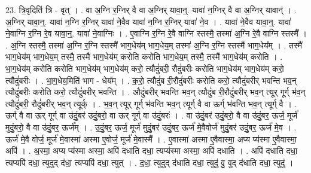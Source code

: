 \documentclass[17pt]{extarticle}
\begin{document}
23. त्रि॒वृदिति॑ त्रि - वृत् । . वा अ॒ग्नि र॒ग्निर् वै वा अ॒ग्निर् यावा॒न्॒. यावा॑ न॒ग्निर् वै वा अ॒ग्निर् यावान्॑ । . अ॒ग्निर् यावा॒न्॒. यावा॑ न॒ग्नि र॒ग्निर् यावा॑ ने॒वैव यावा॑ न॒ग्नि र॒ग्निर् यावा॑ ने॒व । . यावा॑ ने॒वैव यावा॒न्॒. यावा॑ ने॒वाग्नि र॒ग्नि रे॒व यावा॒न्॒. यावा॑ ने॒वाग्निः । . ए॒वाग्नि र॒ग्नि रे॒वै वाग्नि स्तस्मै॒ तस्मा॑ अ॒ग्नि रे॒वै वाग्नि स्तस्मै᳚ । . अ॒ग्नि स्तस्मै॒ तस्मा॑ अ॒ग्नि र॒ग्नि स्तस्मै॑ भाग॒धेय॑म् भाग॒धेय॒म् तस्मा॑ अ॒ग्नि र॒ग्नि स्तस्मै॑ भाग॒धेय᳚म् । . तस्मै॑ भाग॒धेय॑म् भाग॒धेय॒म् तस्मै॒ तस्मै॑ भाग॒धेय॑म् करोति करोति भाग॒धेय॒म् तस्मै॒ तस्मै॑ भाग॒धेय॑म् करोति । . भा॒ग॒धेय॑म् करोति करोति भाग॒धेय॑म् भाग॒धेय॑म् करो॒ त्यौदुं॑बरी॒ रौदुं॑बरीः करोति भाग॒धेय॑म् भाग॒धेय॑म् करो॒ त्यौदुं॑बरीः । . भा॒ग॒धेय॒मिति॑ भाग - धेय᳚म् । . क॒रो॒ त्यौदुं॑ब री॒रौदुं॑बरीः करोति करो॒ त्यौदुं॑बरीर् भवन्ति भव॒न् त्यौदुं॑बरीः करोति करो॒ त्यौदुं॑बरीर् भवन्ति । . औदुं॑बरीर् भवन्ति भव॒न् त्यौदुं॑ब री॒रौदुं॑बरीर् भव॒न् त्यूर् गूर्ग् भ॑व॒न् त्यौदुं॑बरी॒ रौदुं॑बरीर् भव॒न् त्यूर्क् । . भ॒व॒न् त्यूर् गूर्ग् भ॑वन्ति भव॒न् त्यूर्ग् वै वा ऊर्ग् भ॑वन्ति भव॒न् त्यूर्ग् वै । . ऊर्ग् वै वा ऊर् गूर्ग् वा उ॑दुं॒बर॑ उदुं॒बरो॒ वा ऊर् गूर्ग् वा उ॑दुं॒बरः॑ । . वा उ॑दुं॒बर॑ उदुं॒बरो॒ वै वा उ॑दुं॒बर॒ ऊर्ज॒ मूर्ज॑ मुदुं॒बरो॒ वै वा उ॑दुं॒बर॒ ऊर्ज᳚म् । . उ॒दुं॒बर॒ ऊर्ज॒ मूर्ज॑ मुदुं॒बर॑ उदुं॒बर॒ ऊर्ज॑ मे॒वैवोर्ज॑ मुदुं॒बर॑ उदुं॒बर॒ ऊर्ज॑ मे॒व । . ऊर्ज॑ मे॒वै वोर्ज॒ मूर्ज॑ मे॒वास्मा॑ अस्मा ए॒वोर्ज॒ मूर्ज॑ मे॒वास्मै᳚ । . ए॒वास्मा॑ अस्मा ए॒वैवास्मा॒ अप्य प्य॑स्मा ए॒वैवास्मा॒ अपि॑ । . अ॒स्मा॒ अप्य प्य॑स्मा अस्मा॒ अपि॑ दधाति दधा॒ त्यप्य॑स्मा अस्मा॒ अपि॑ दधाति । . अपि॑ दधाति दधा॒ त्यप्यपि॑ दधा॒ त्युदुद् द॑धा॒ त्यप्यपि॑ दधा॒ त्युत् । . द॒धा॒ त्युदुद् द॑धाति दधा॒ त्युदु॑ वु॒ वुद् द॑धाति दधा॒ त्युदु॑ । \newline
\end{document}
